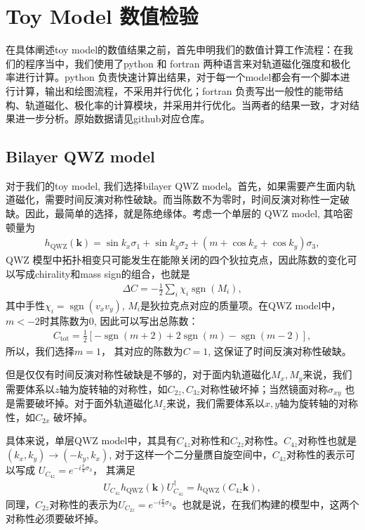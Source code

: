 \documentclass[10pt, oneside]{article}
\begin{document}
\section{Toy Model 数值检验}
在具体阐述toy model的数值结果之前，首先申明我们的数值计算工作流程：在我们的程序当中，我们使用了python 和 fortran 两种语言来对轨道磁化强度和极化率进行计算。python 负责快速计算出结果，对于每一个model都会有一个脚本进行计算，输出和绘图流程，不采用并行优化；fortran 负责写出一般性的能带结构、轨道磁化、极化率的计算模块，并采用并行优化。当两者的结果一致，才对结果进一步分析。原始数据请见github对应仓库。

\subsection{Bilayer QWZ model}
对于我们的toy model, 我们选择bilayer QWZ model。首先，如果需要产生面内轨道磁化，需要时间反演对称性破缺。而当陈数不为零时，时间反演对称性一定破缺。因此，最简单的选择，就是陈绝缘体。考虑一个单层的 QWZ model, 其哈密顿量为
\begin{align} 
	h_{\mathrm{QWZ}} \left(\bm{k}\right) = \sin{k_{x}} \sigma_{1} + \sin{k_{y}} \sigma_{2} + \left(m + \cos{ k_{x} } + \cos{ k_{y}}\right) \sigma_{3},
\end{align}
QWZ 模型中拓扑相变只可能发生在能隙关闭的四个狄拉克点，因此陈数的变化可以写成chirality和mass sign的组合，也就是
\begin{align}
	\Delta C = -\frac{1}{2} \sum_{i} \chi_{i} \operatorname{sgn}(M_i),
\end{align}
其中手性\(\chi_{i} = \operatorname{sgn}(v_x v_y)\), \(M_i\)是狄拉克点对应的质量项。在QWZ model中，\(m < -2\)时其陈数为\(0\), 因此可以写出总陈数：
\begin{align}
	C_{\mathrm{tot}} = \frac{1}{2} \left[-\operatorname{sgn}\left(m+2\right) + 2 \operatorname{sgn}\left(m\right) - \operatorname{sgn} \left(m-2\right)\right],
\end{align}
所以，我们选择\(m = 1\)， 其对应的陈数为\(C = 1\), 这保证了时间反演对称性破缺。

但是仅仅有时间反演对称性破缺是不够的，对于面内轨道磁化\(M_x, M_y\)来说，我们需要体系以\(z\)轴为旋转轴的对称性，如\(C_{2z}, C_{3z}\)对称性破坏掉；当然镜面对称\(\sigma_{xy}\) 也是需要破坏掉。对于面外轨道磁化\(M_{z}\)来说，我们需要体系以\(x,y\)轴为旋转轴的对称性，如\(C_{2x}\) 破坏掉。

具体来说，单层QWZ model中，其具有\(C_{4z}\)对称性和\(C_{2z}\)对称性。\(C_{4z}\)对称性也就是\(\left(k_{x},k_{y}\right) \rightarrow \left(-k_{y}, k_{x}\right) \), 对于这样一个二分量赝自旋空间中，\(C_{4z}\)对称性的表示可以写成 \(U_{C_{4z}} = e^{-i \frac{\pi}{4} \sigma_{3}} \)， 其满足
\begin{align}
	U_{C_{4z}} h_{\mathrm{QWZ}} \left(\bm{k }\right) U^{\dagger}_{C_{4z}} =  h_{\mathrm{QWZ}} \left( C_{4z} \bm{k }\right),
\end{align}
同理，\(C_{2z}\)对称性的表示为\(U_{C_{2z}} = e^{-i \frac{\pi}{2}\sigma_{3}}\)。也就是说，在我们构建的模型中，这两个对称性必须要破坏掉。
\end{document}
